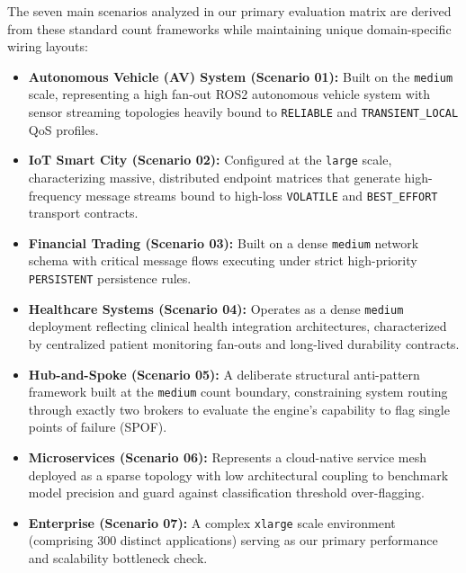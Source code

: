 \documentclass[sigconf,9pt,anonymous]{acmart}
\begin{document}
The seven main scenarios analyzed in our primary evaluation matrix are derived from these standard count frameworks while maintaining unique domain-specific wiring layouts:
\begin{itemize}
    \item \textbf{Autonomous Vehicle (AV) System (Scenario 01):} Built on the \texttt{medium} scale, representing a high fan-out ROS2 autonomous vehicle system with sensor streaming topologies heavily bound to \texttt{RELIABLE} and \texttt{TRANSIENT\_LOCAL} QoS profiles.
    \item \textbf{IoT Smart City (Scenario 02):} Configured at the \texttt{large} scale, characterizing massive, distributed endpoint matrices that generate high-frequency message streams bound to high-loss \texttt{VOLATILE} and \texttt{BEST\_EFFORT} transport contracts.
    \item \textbf{Financial Trading (Scenario 03):} Built on a dense \texttt{medium} network schema with critical message flows executing under strict high-priority \texttt{PERSISTENT} persistence rules.
    \item \textbf{Healthcare Systems (Scenario 04):} Operates as a dense \texttt{medium} deployment reflecting clinical health integration architectures, characterized by centralized patient monitoring fan-outs and long-lived durability contracts.
    \item \textbf{Hub-and-Spoke (Scenario 05):} A deliberate structural anti-pattern framework built at the \texttt{medium} count boundary, constraining system routing through exactly two brokers to evaluate the engine's capability to flag single points of failure (SPOF).
    \item \textbf{Microservices (Scenario 06):} Represents a cloud-native service mesh deployed as a sparse topology with low architectural coupling to benchmark model precision and guard against classification threshold over-flagging.
    \item \textbf{Enterprise (Scenario 07):} A complex \texttt{xlarge} scale environment (comprising 300 distinct applications) serving as our primary performance and scalability bottleneck check.
\end{itemize}
\end{document}
